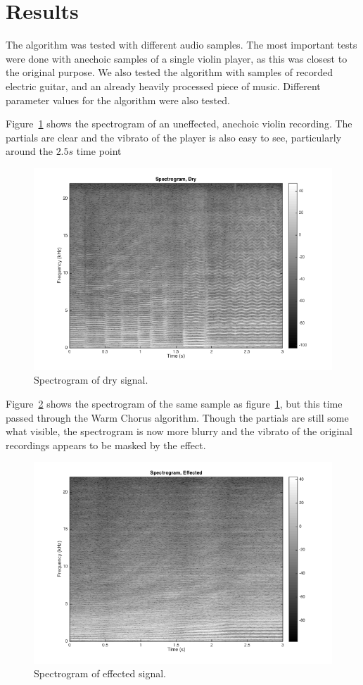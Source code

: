 \section{Results}
The algorithm was tested with different audio samples. The most important tests were done with anechoic samples of a single violin player, as this was closest to the original purpose. We also tested the algorithm with samples of recorded electric guitar, and an already heavily processed piece of music. Different parameter values for the algorithm were also tested.

Figure~\ref{fig:dryspec} shows the spectrogram of an uneffected, anechoic violin recording. The partials are clear and the vibrato of the player is also easy to see, particularly around the $2.5s$ time point
\begin{figure}[ht]
\centering
\includegraphics[width=\textwidth]{dry_spec.png}
\caption{Spectrogram of dry signal.}
\label{fig:dryspec}
\end{figure}

Figure~\ref{fig:effspec} shows the spectrogram of the same sample as figure~\ref{fig:dryspec}, but this time passed through the Warm Chorus algorithm. Though the partials are still some what visible, the spectrogram is now more blurry and the vibrato of the original recordings appears to be masked by the effect.
\begin{figure}[ht]
\centering
\includegraphics[width=\textwidth]{effected_spec.png}
\caption{Spectrogram of effected signal.}
\label{fig:effspec}
\end{figure}

